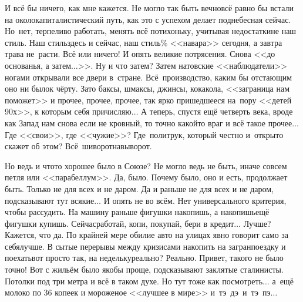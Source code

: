 И всё бы ничего, как мне кажется. Не могло так быть вечно\mdash всё равно бы встали на околокапиталистический путь, как это с успехом делает поднебесная сейчас. Но~нет, терпеливо работать, менять всё потихоньку, учитывая недостатки\mdash не наш стиль. Наш стиль\mdash здесь и сейчас, наш стиль\% <<навара>> сегодня, а завтра трава не~расти. Всё или ничего! И опять великие потрясения. Снова <<до основанья, а затем$\ldots$>>. Ну и что затем? Затем натовские <<наблюдатели>> ногами открывали все двери в~стране. Всё~производство, каким бы отстающим оно ни было\mdash к чёрту. Зато баксы, шмаксы, джинсы, кока\sdash кола, <<заграница нам поможет>> и прочее, прочее, прочее, так ярко пришедшееся на~пору <<детей 90\sdash х>>, к которым себя причисляю$\ldots$ А теперь, спустя ещё четверть века, вроде как Запад нам снова если не кровный, то точно какой\sdash то враг и всё такое прочее$\ldots$ Где <<свои>>, где <<чужие>>? Где~политрук, который честно и~открыто скажет об этом? Всё~шиворот\sdash навыворот.

Но ведь и что\sdash то хорошее было в Союзе? Не могло ведь не быть, иначе совсем петля или <<парабеллум>>. Да, было. Почему было, оно и есть, продолжает быть. Только не для всех и не даром. Да и раньше не для всех и не даром, подсказывают тут всякие$\ldots$
И опять не во всём. Нет универсального критерия, чтобы рассудить. На машину раньше фигушки накопишь, а накопишь\mdash ещё фигушки купишь. Сейчас\mdash работай, копи, покупай, бери в кредит$\ldots$ Лучше? Кажется, что да. По крайней мере обилие авто на улицах явно говорит само за себя\mdash лучше. В сытые перерывы между кризисами накопить на загранпоездку и поехать\mdash вот просто так, на недельку\mdash реально? Реально. Привет, такого не было точно! 
Вот с жильём было якобы проще, подсказывают заклятые сталинисты. Потолки под три метра и всё в таком духе. Но тут тоже как посмотреть$\ldots$ а~ещё молоко по 36 копеек и мороженое <<лучшее в мире>> и~тэ~дэ~и~тэ~пэ$\ldots$ 

